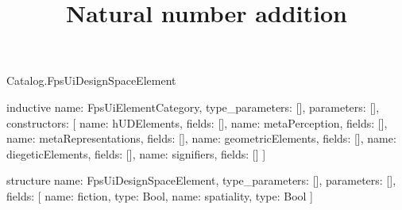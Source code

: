 \begin{lexlean}{Catalog.FpsUiDesignSpaceElement}
\title{Natural number addition}
\begin{semanticmodule}
inductive{
  name: FpsUiElementCategory,
  type_parameters: [],
  parameters: [],
  constructors: [
    {name: hUDElements, fields: []},
    {name: metaPerception, fields: []},
    {name: metaRepresentations, fields: []},
    {name: geometricElements, fields: []},
    {name: diegeticElements, fields: []},
    {name: signifiers, fields: []}
  ]
}

structure{
  name: FpsUiDesignSpaceElement,
  type_parameters: [],
  parameters: [],
  fields: [
    {name: fiction, type: Bool},
    {name: spatiality, type: Bool}
  ]
}
\end{semanticmodule}
\end{lexlean}
